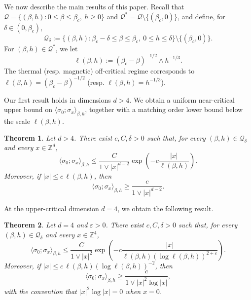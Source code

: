 \documentclass[10pt,a4paper]{amsart}
\numberwithin{equation}{section}
\newtheorem{Thm}{Theorem}[section]
\begin{document}
We now describe the main results of this paper. Recall that $\mathcal Q=\{(\beta,h):0\leq\beta\leq\beta_c,\ h\geq0\}$ and $\mathcal Q^*=\mathcal Q\setminus \{(\beta_c,0)\}$, and define, for $\delta\in (0,\beta_c)$,
\begin{equation}
    \mathcal Q_\delta
    :=\{(\beta,h):\beta_c-\delta\leq\beta\leq\beta_c,\
    0\leq h\leq\delta\}\setminus \{(\beta_c,0)\}.
\end{equation}
For $(\beta,h)\in \mathcal Q^*$, we let
\begin{equation}
	\ell(\beta,h):=(\beta_c-\beta)^{-1/2}\wedge h^{-1/3}.
\end{equation}
The thermal (resp. magnetic) off-critical regime corresponds to $\ell(\beta,h)=(\beta_c-\beta)^{-1/2}$ (resp. $\ell(\beta,h)=h^{-1/3}$).

Our first result holds in dimensions $d>4$. We obtain a uniform near-critical
upper bound on $\langle \sigma_0;\sigma_x\rangle_{\beta,h}$, together with a matching
order lower bound below the scale $\ell(\beta,h)$.

\begin{Thm}\label{thm:main}
Let $d>4$.  There exist $c,C,\delta>0$ such that, for every
$(\beta,h)\in\mathcal Q_\delta$ and every $x\in\mathbb Z^d$,
\begin{equation}\label{eq:main upper intro}
    \langle\sigma_0;\sigma_x\rangle_{\beta,h}
    \leq \frac{C}{1\vee|x|^{d-2}}
    \exp\left(-c\frac{|x|}{\ell(\beta,h)}\right).
\end{equation}
Moreover, if $|x|\leq c\,\ell(\beta,h)$, then
\begin{equation}\label{eq:main lower intro}
    \langle\sigma_0;\sigma_x\rangle_{\beta,h}
    \geq \frac{c}{1\vee|x|^{d-2}}.
\end{equation}
\end{Thm}

At the upper-critical dimension $d=4$, we obtain the following result.


\begin{Thm}\label{thm:main bis}
Let $d=4$ and $\varepsilon>0$.  There exist $c,C,\delta>0$ such that, for every
$(\beta,h)\in\mathcal Q_\delta$ and every $x\in\mathbb Z^4$,
\begin{equation}\label{eq:nc up bound thm bis}
    \langle\sigma_0;\sigma_x\rangle_{\beta,h}
    \leq \frac{C}{1\vee|x|^2}
    \exp\left(
        -c\frac{|x|}
        {\ell(\beta,h)(\log\ell(\beta,h))^{2+\varepsilon}}
    \right).
\end{equation}
Moreover, if
$|x|\leq c\,\ell(\beta,h)(\log\ell(\beta,h))^{-2}$, then
\begin{equation}\label{eq:main lower four intro}
    \langle\sigma_0;\sigma_x\rangle_{\beta,h}
    \geq \frac{c}{1\vee|x|^2\log|x|},
\end{equation}
with the convention that $|x|^2\log|x|=0$ when $x=0$.
\end{Thm}
\end{document}
